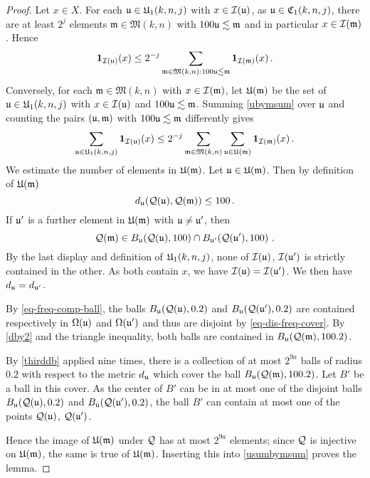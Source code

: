 \begin{proof}
\leanok
Let $x\in X$. For each
${\mathfrak u}\in {\mathfrak U}_1(k,n,j)$ with $x\in {\mathcal{I}}({\mathfrak u})$, as ${\mathfrak u} \in {\mathfrak C}_1(k,n,j)$,
there are at least $2^{j}$ elements $\mathfrak{m}\in \mathfrak{M}(k,n)$
with $100{\mathfrak u} \lesssim \mathfrak{m}$ and in particular
$x\in {\mathcal{I}}(\mathfrak{m})$. Hence
\begin{equation}\label{ubymsum}
     \mathbf{1}_{{\mathcal{I}}({\mathfrak u})}(x)
    \le 2^{-j}\sum_{\mathfrak{m} \in \mathfrak{M}(k,n): 100{\mathfrak u}\lesssim \mathfrak{m}} \mathbf{1}_{{\mathcal{I}}(\mathfrak{m})}(x)\, .
\end{equation}
Conversely, for each $\mathfrak{m}\in \mathfrak{M}(k,n)$
with $x\in {\mathcal{I}}(\mathfrak{m})$,
let ${\mathfrak U}(\mathfrak{m})$ be the set of
${\mathfrak u}\in {\mathfrak U}_1(k,n,j)$ with $x\in {\mathcal{I}}({\mathfrak u})$
and $100{\mathfrak u} \lesssim \mathfrak{m}$.
Summing \eqref{ubymsum} over ${\mathfrak u}$ and counting the pairs
$({\mathfrak u},\mathfrak{m})$ with $100{\mathfrak u} \lesssim \mathfrak{m}$
differently gives
\begin{equation}\label{usumbymsum}
     \sum_{{\mathfrak u}\in {\mathfrak U}_1(k,n,j)} \mathbf{1}_{{\mathcal{I}}({\mathfrak u})}(x)
    \le 2^{-j}\sum_{\mathfrak{m} \in \mathfrak{M}(k,n)}
    \sum_{{\mathfrak u} \in {\mathfrak U}(\mathfrak{m})} \mathbf{1}_{{\mathcal{I}}(\mathfrak{m})}(x)\, .
\end{equation}
We estimate the number of elements in ${\mathfrak U}(\mathfrak{m})$.
Let ${\mathfrak u} \in {\mathfrak U}(\mathfrak{m})$.
Then by definition of
${\mathfrak U}(\mathfrak{m})$
\begin{equation}\label{dby2}
     d_{{\mathfrak u}}({\mathcal{Q}}({\mathfrak u}),{\mathcal{Q}}(\mathfrak{m}))\le 100\, .
\end{equation}
If ${\mathfrak u}'$ is a further element in ${\mathfrak U}(\mathfrak{m})$ with ${\mathfrak u}\neq {\mathfrak u}'$, then
\begin{equation}
    {\mathcal{Q}}(\mathfrak{m})
    \in B_{{\mathfrak u}}({\mathcal{Q}}({\mathfrak u}),100)\cap B_{{\mathfrak u}'}({\mathcal{Q}}({\mathfrak u}'),100)\ .
\end{equation}
By the last display and definition of ${\mathfrak U}_1(k,n,j)$, none of ${\mathcal{I}}({\mathfrak u})$, ${\mathcal{I}}({\mathfrak u}')$ is strictly contained in the other. As both contain $x$, we have ${\mathcal{I}}({\mathfrak u})={\mathcal{I}}({\mathfrak u}')$.
We then have $d_{{\mathfrak u}}=d_{{\mathfrak u}'}$.

By \eqref{eq-freq-comp-ball}, the balls
$B_{{\mathfrak u}}({\mathcal{Q}}({\mathfrak u}),0.2)$ and
$B_{{\mathfrak u}}({\mathcal{Q}}({\mathfrak u}'),0.2)$ are
contained respectively in ${\Omega}({\mathfrak u})$
and ${\Omega}({\mathfrak u}')$ and thus are disjoint by \eqref{eq-dis-freq-cover}.
By \eqref{dby2} and the triangle inequality, both balls are contained in $B_{{\mathfrak u}}({\mathcal{Q}}(\mathfrak{m}), 100.2)$.

By \eqref{thirddb} applied nine times, there is a collection of at most
$2^{9a}$ balls of radius $0.2$ with respect to the metric $d_{{\mathfrak u}}$ which cover the ball $B_{{\mathfrak u}}({\mathcal{Q}}(\mathfrak{m}),100.2)$.
Let $B'$ be a ball in this cover.
As the center of $B'$ can be in at most one of the disjoint balls
$B_{{\mathfrak u}}({\mathcal{Q}}({\mathfrak u}),0.2)$ and
$B_{{\mathfrak u}}({\mathcal{Q}}({\mathfrak u}'),0.2)$,
the ball $B'$ can contain at most
one of the points ${\mathcal{Q}}({\mathfrak u})$, ${\mathcal{Q}}({\mathfrak u}')$.

Hence the image of ${\mathfrak U}(\mathfrak{m})$ under ${\mathcal{Q}}$ has at most
$2^{9a}$ elements; since ${\mathcal{Q}}$ is injective on ${\mathfrak U}(\mathfrak{m})$,
the same is true of ${\mathfrak U}(\mathfrak{m})$.
Inserting this into \eqref{usumbymsum} proves the lemma.
\end{proof}

